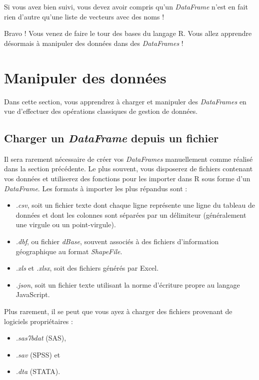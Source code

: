 \documentclass[
  11pt,
  french,
]{book}
\providecommand{\tightlist}{%
  \setlength{\itemsep}{0pt}\setlength{\parskip}{0pt}}
\begin{document}
Si vous avez bien suivi, vous devez avoir compris qu'un \emph{DataFrame} n'est en fait rien d'autre qu'une liste de vecteurs avec des noms !

Bravo ! Vous venez de faire le tour des bases du langage R. Vous allez apprendre désormais à manipuler des données dans des \emph{DataFrames} !

\hypertarget{sect014}{%
\section{Manipuler des données}\label{sect014}}

Dans cette section, vous apprendrez à charger et manipuler des \emph{DataFrames} en vue d'effectuer des opérations classiques de gestion de données.

\hypertarget{sect0141}{%
\subsection{\texorpdfstring{Charger un \emph{DataFrame} depuis un fichier}{Charger un DataFrame depuis un fichier}}\label{sect0141}}

Il sera rarement nécessaire de créer vos \emph{DataFrames} manuellement comme réalisé dans la section précédente. Le plus souvent, vous disposerez de fichiers contenant vos données et utiliserez des fonctions pour les importer dans R sous forme d'un \emph{DataFrame}. Les formats à importer les plus répandus sont :

\begin{itemize}
\tightlist
\item
  \emph{.csv}, soit un fichier texte dont chaque ligne représente une ligne du tableau de données et dont les colonnes sont séparées par un délimiteur (généralement une virgule ou un point-virgule).
\item
  \emph{.dbf}, ou fichier \emph{dBase}, souvent associés à des fichiers d'information géographique au format \emph{ShapeFile}.
\item
  \emph{.xls} et \emph{.xlsx}, soit des fichiers générés par Excel.
\item
  \emph{.json}, soit un fichier texte utilisant la norme d'écriture propre au langage JavaScript.
\end{itemize}

Plus rarement, il se peut que vous ayez à charger des fichiers provenant de logiciels propriétaires :

\begin{itemize}
\tightlist
\item
  \emph{.sas7bdat} (SAS),
\item
  \emph{.sav} (SPSS) et
\item
  \emph{.dta} (STATA).
\end{itemize}
\end{document}

